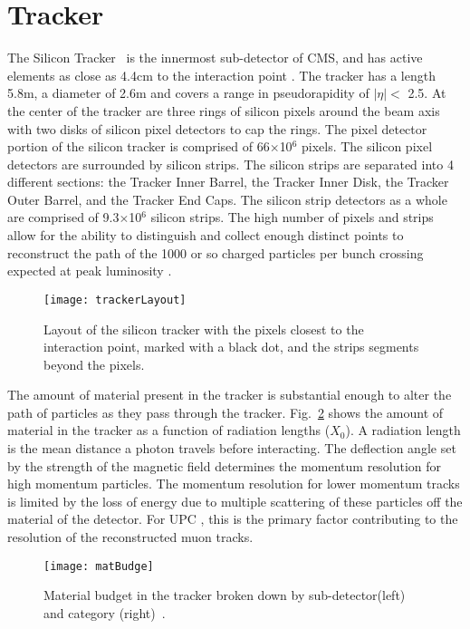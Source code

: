   \section{Tracker}
    The Silicon Tracker~\cite{CMS:2000aa} is the innermost sub-detector of CMS, and has active
    	elements as close as 4.4cm to the interaction point \cite{tCmsE}. 
    The tracker has a length 5.8m, a diameter of 2.6m and
    	covers a range in pseudorapidity of $|\eta| <$ 2.5.
    At the center of the tracker are three rings of silicon pixels around the 
      beam axis with two disks of silicon pixel detectors to cap the rings.
    The pixel detector portion of the silicon tracker is comprised of 66$\times$10$^{6}$
    	pixels.
    The silicon pixel detectors are surrounded by silicon strips.
    The silicon strips are separated into 4 different sections: 
    	the Tracker Inner Barrel, the Tracker Inner Disk, the Tracker Outer 
    	Barrel, and the Tracker End Caps.
    The silicon strip detectors as a whole are comprised of 9.3$\times$10$^{6}$ silicon 
    	strips.
    The high number of pixels and strips allow for the ability to distinguish
    	and collect enough distinct points to reconstruct the path of the 1000
    	or so charged particles per bunch crossing expected at peak luminosity
    	\cite{tCmsE}.
    \begin{figure}[!Hhbt]
      \centering
      \texttt{[image: trackerLayout]}
      \caption{Layout of the silicon tracker with the pixels closest to the 
        interaction point, marked with a black dot, and the strips segments 
        beyond the pixels.}
      \label{fig:fig:trackerLayout}
    \end{figure}

    The amount of material present in the tracker is substantial enough to
      alter the path of particles as they pass through the tracker. 
    Fig.~\ref{fig:matBudge} shows the amount of material in the tracker 
      as a function of radiation lengths ($X_{0}$).
    A radiation length is the mean distance a photon travels before 
      interacting. 
    The deflection angle set by the strength of the magnetic 
      field determines the momentum resolution for high momentum particles. 
    The momentum resolution for lower momentum tracks is limited by 
      the loss of energy due to multiple scattering of these particles off the 
      material of the detector.
    For UPC \JPsi{}, this is the primary factor contributing to the resolution 
      of the reconstructed muon tracks. 
    \begin{figure}[!Hhbt]
      \centering
      \texttt{[image: matBudge]}
      \caption{Material budget in the tracker broken down by sub-detector(left) and
        category (right)~\cite{tCmsE}.}
      \label{fig:matBudge}
    \end{figure}

